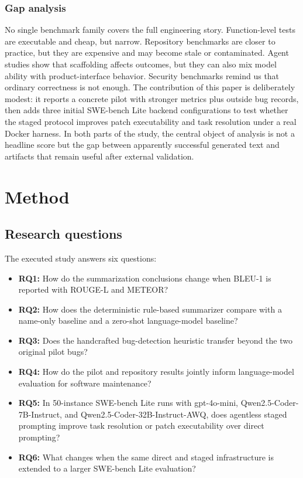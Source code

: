 \documentclass[preprint,12pt]{elsarticle}
\begin{document}
\subsubsection{Gap analysis}
No single benchmark family covers the full engineering story. Function-level tests are executable and cheap, but narrow. Repository benchmarks are closer to practice, but they are expensive and may become stale or contaminated. Agent studies show that scaffolding affects outcomes, but they can also mix model ability with product-interface behavior. Security benchmarks remind us that ordinary correctness is not enough. The contribution of this paper is deliberately modest: it reports a concrete pilot with stronger metrics plus outside bug records, then adds three initial SWE-bench Lite backend configurations to test whether the staged protocol improves patch executability and task resolution under a real Docker harness. In both parts of the study, the central object of analysis is not a headline score but the gap between apparently successful generated text and artifacts that remain useful after external validation.

\section{Method}

\subsection{Research questions}

The executed study answers six questions:

\begin{itemize}[leftmargin=*]
    \item \textbf{RQ1:} How do the summarization conclusions change when BLEU-1 is reported with ROUGE-L and METEOR?
    \item \textbf{RQ2:} How does the deterministic rule-based summarizer compare with a name-only baseline and a zero-shot language-model baseline?
    \item \textbf{RQ3:} Does the handcrafted bug-detection heuristic transfer beyond the two original pilot bugs?
    \item \textbf{RQ4:} How do the pilot and repository results jointly inform language-model evaluation for software maintenance?
    \item \textbf{RQ5:} In 50-instance SWE-bench Lite runs with gpt-4o-mini, Qwen2.5-Coder-7B-Instruct, and Qwen2.5-Coder-32B-Instruct-AWQ, does agentless staged prompting improve task resolution or patch executability over direct prompting?
    \item \textbf{RQ6:} What changes when the same direct and staged infrastructure is extended to a larger SWE-bench Lite evaluation?
\end{itemize}
\end{document}
